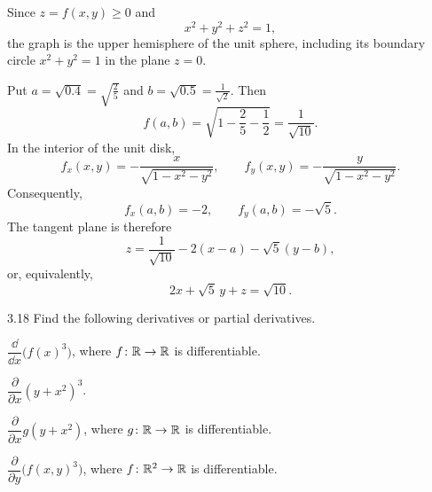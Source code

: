 \documentclass[11pt,oneside]{article}
\begin{document}
\begin{solution}
\begin{problemsubparts}
    \item Since $z=f(x,y)\geq0$ and
    \[
        x^2+y^2+z^2=1,
    \]
    the graph is the upper hemisphere of the unit sphere, including its boundary circle $x^2+y^2=1$ in the plane $z=0$.

    \begin{center}
    \end{center}

    \item Put $a=\sqrt{0.4}=\sqrt{\frac25}$ and $b=\sqrt{0.5}=\frac1{\sqrt2}$. Then
    \[
        f(a,b)=\sqrt{1-\frac25-\frac12}=\frac1{\sqrt{10}}.
    \]
    In the interior of the unit disk,
    \[
        f_x(x,y)=-\frac{x}{\sqrt{1-x^2-y^2}},
        \qquad
        f_y(x,y)=-\frac{y}{\sqrt{1-x^2-y^2}}.
    \]
    Consequently,
    \[
        f_x(a,b)=-2,
        \qquad
        f_y(a,b)=-\sqrt5.
    \]
    The tangent plane is therefore
    \[
        z=\frac1{\sqrt{10}}-2(x-a)-\sqrt5(y-b),
    \]
    or, equivalently,
    \[
        \boxed{2x+\sqrt5\,y+z=\sqrt{10}}.
    \]
\end{problemsubparts}
\end{solution}

\begin{problem}{3.18}
Find the following derivatives or partial derivatives.
\begin{problemsubparts}
    \item $\dfrac{\dd}{\dd x}\bigl(f(x)^3\bigr)$, where $f\colon\mathbb{R}\to\mathbb{R}$ is differentiable.
    \item $\dfrac{\partial}{\partial x}(y+x^2)^3$.
    \item $\dfrac{\partial}{\partial x}g(y+x^2)$, where $g\colon\mathbb{R}\to\mathbb{R}$ is differentiable.
    \item $\dfrac{\partial}{\partial y}\bigl(f(x,y)^3\bigr)$, where $f\colon\mathbb{R}^2\to\mathbb{R}$ is differentiable.
\end{problemsubparts}
\end{problem}
\end{document}
